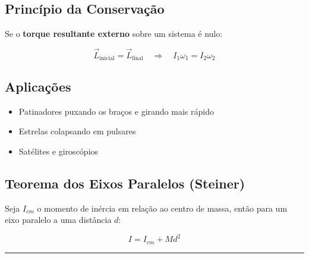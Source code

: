 \documentclass[a4paper,12pt]{article}
\begin{document}
\subsection*{Princípio da Conservação}

Se o \textbf{torque resultante externo} sobre um sistema é nulo:

\[
\vec{L}_{\text{inicial}} = \vec{L}_{\text{final}}
\quad \Rightarrow \quad I_1 \omega_1 = I_2 \omega_2
\]

\subsection*{Aplicações}

\begin{itemize}
  \item Patinadores puxando os braços e girando mais rápido
  \item Estrelas colapsando em pulsares
  \item Satélites e giroscópios
\end{itemize}

\subsection*{Teorema dos Eixos Paralelos (Steiner)}
Seja $I_{cm}$ o momento de inércia em relação ao centro de massa, então para um eixo paralelo a uma distância $d$:

\[
\boxed{ 
I = I_{cm} + M d^2
}
\]

\noindent\rule{\linewidth}{0.6pt}\\
\end{document}
